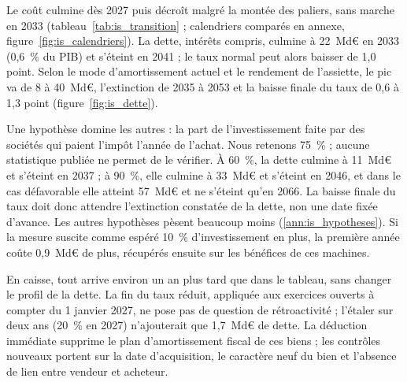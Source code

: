 Le coût culmine dès 2027 puis décroît malgré la montée des paliers, sans marche en 2033
(tableau~\ref{tab:is_transition} ; calendriers comparés en annexe, figure~\ref{fig:is_calendriers}). La dette,
intérêts compris, culmine à 22~Md€ en 2033 (0,6~\% du PIB) et s'éteint en 2041 ; le taux normal peut alors baisser de
1,0 point. Selon le mode d'amortissement actuel et le rendement de l'assiette, le pic va de 8 à 40~Md€, l'extinction
de 2035 à 2053 et la baisse finale du taux de 0,6 à 1,3 point (figure~\ref{fig:is_dette}).



Une hypothèse domine les autres : la part de l'investissement faite par des sociétés qui paient l'impôt l'année de
l'achat. Nous retenons 75~\% ; aucune statistique publiée ne permet de le vérifier. À 60~\%, la dette culmine à
11~Md€ et s'éteint en 2037 ; à 90~\%, elle culmine à 33~Md€ et s'éteint en 2046, et dans le cas défavorable elle
atteint 57~Md€ et ne s'éteint qu'en 2066. La baisse finale du taux doit donc attendre l'extinction constatée de la
dette, non une date fixée d'avance. Les autres hypothèses pèsent beaucoup moins (\ref{ann:is_hypotheses}). Si la
mesure suscite comme espéré 10~\% d'investissement en plus, la première année coûte 0,9~Md€ de plus, récupérés ensuite
sur les bénéfices de ces machines.


En caisse, tout arrive environ un an plus tard que dans le tableau, sans changer le profil de la dette. La fin du taux
réduit, appliquée aux exercices ouverts à compter du 1 janvier 2027, ne pose pas de question de rétroactivité ;
l'étaler sur deux ans (20~\% en 2027) n'ajouterait que 1,7~Md€ de dette. La déduction immédiate supprime le plan d'amortissement fiscal de ces biens ; les contrôles nouveaux
portent sur la date d'acquisition, le caractère neuf du bien et l'absence de lien entre vendeur et acheteur.
